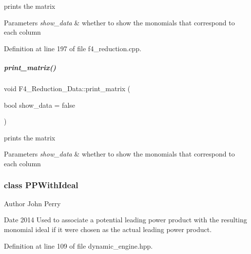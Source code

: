 prints the matrix 


\begin{DoxyParams}{Parameters}
{\em show\+\_\+data} & whether to show the monomials that correspond to each column \\
\hline
\end{DoxyParams}


Definition at line 197 of file f4\+\_\+reduction.\+cpp.

\mbox{\label{group___g_b_computation_a9f3e9b5617084c34f97acd23d6e67a43}} 
\subparagraph{\texorpdfstring{print\+\_\+matrix()}{print\_matrix()}\hspace{0.1cm}{\footnotesize\ttfamily [2/2]}}
{\footnotesize\ttfamily void F4\+\_\+\+Reduction\+\_\+\+Data\+::print\+\_\+matrix (\begin{DoxyParamCaption}\item[{bool}]{show\+\_\+data = {\ttfamily false} }\end{DoxyParamCaption})}



prints the matrix 


\begin{DoxyParams}{Parameters}
{\em show\+\_\+data} & whether to show the monomials that correspond to each column \\
\hline
\end{DoxyParams}
\label{class_p_p_with_ideal}
\subsubsection{class P\+P\+With\+Ideal}
\begin{DoxyAuthor}{Author}
John Perry 
\end{DoxyAuthor}
\begin{DoxyDate}{Date}
2014 Used to associate a potential leading power product with the resulting monomial ideal if it were chosen as the actual leading power product. 
\end{DoxyDate}


Definition at line 109 of file dynamic\+\_\+engine.\+hpp.

